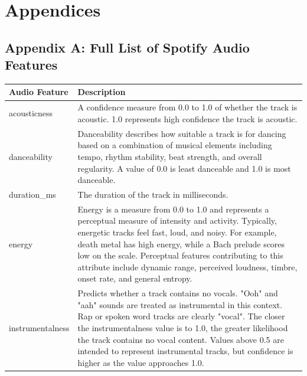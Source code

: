 \documentclass{article}
\begin{document}
\pagebreak

\section{Appendices}

\subsection*{Appendix A: Full List of Spotify Audio Features}\label{sec:appendixA}

\begin{table}[htbp]
    \centering
    \begin{tabular}{l p{}}
        \toprule
        \textbf{Audio Feature} & \textbf{Description} \\
        \midrule

        acousticness & A confidence measure from 0.0 to 1.0 of whether the track is acoustic. 1.0 represents high confidence the track is acoustic. \\[3pt]

        danceability & Danceability describes how suitable a track is for dancing based on a combination of musical elements including tempo, rhythm stability, beat strength, and overall regularity. A value of 0.0 is least danceable and 1.0 is most danceable. \\[3pt]

        duration\_ms & The duration of the track in milliseconds. \\[3pt]

        energy & Energy is a measure from 0.0 to 1.0 and represents a perceptual measure of intensity and activity. Typically, energetic tracks feel fast, loud, and noisy. For example, death metal has high energy, while a Bach prelude scores low on the scale. Perceptual features contributing to this attribute include dynamic range, perceived loudness, timbre, onset rate, and general entropy. \\[3pt]

        instrumentalness & Predicts whether a track contains no vocals. "Ooh" and "aah" sounds are treated as instrumental in this context. Rap or spoken word tracks are clearly "vocal". The closer the instrumentalness value is to 1.0, the greater likelihood the track contains no vocal content. Values above 0.5 are intended to represent instrumental tracks, but confidence is higher as the value approaches 1.0. \\[3pt]


\end{tabular}
\end{table}
\end{document}
